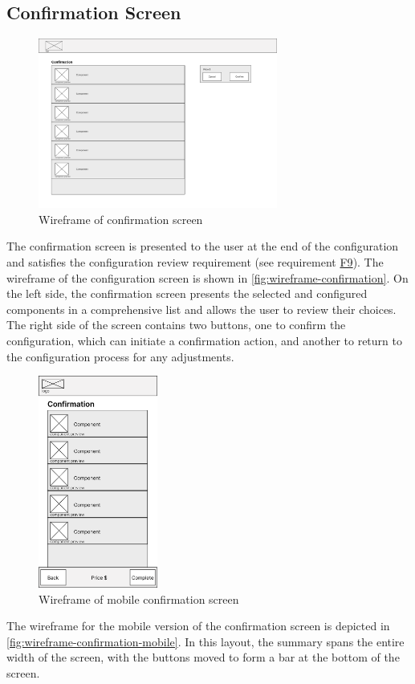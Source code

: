 \subsection{Confirmation Screen}

\begin{figure}[hb]
\centering
\includegraphics[width=0.7\textwidth]{images/wireframe_confirmation_default.png}
\caption{Wireframe of confirmation screen}
\label{fig:wireframe-confirmation}
\end{figure}

The confirmation screen is presented to the user at the end of the configuration and satisfies the configuration review requirement (see requirement \hyperref[itm:F9]{F9}). The wireframe of the configuration screen is shown in \autoref{fig:wireframe-confirmation}. On the left side, the confirmation screen presents the selected and configured components in a comprehensive list and allows the user to review their choices. The right side of the screen contains two buttons, one to confirm the configuration, which can initiate a confirmation action, and another to return to the configuration process for any adjustments. 

\begin{figure}[htb]
\centering
\includegraphics[width=0.35\textwidth]{images/wireframe_confirmation_mobile_default.png}
\caption{Wireframe of mobile confirmation screen}
\label{fig:wireframe-confirmation-mobile}
\end{figure}

The wireframe for the mobile version of the confirmation screen is depicted in  \autoref{fig:wireframe-confirmation-mobile}. In this layout, the summary spans the entire width of the screen, with the buttons moved to form a bar at the bottom of the screen.